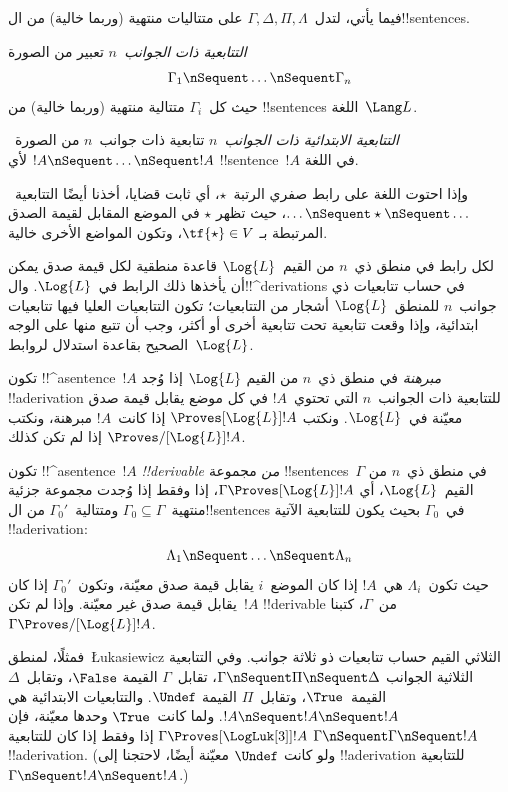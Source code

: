 \documentclass[../../../include/open-logic-section]{subfiles}
\begin{document}


فيما يأتي، لتدل~$\Gamma, \Delta, \Pi, \Lambda$ على متتاليات منتهية
(وربما خالية) من ال!!{sentence}s.

\begin{defn}[التتابعية]
\emph{التتابعية ذات الجوانب~$n$} تعبير من الصورة
\[
\Gamma_1 \nSequent \dots \nSequent \Gamma_n
\]
حيث كل~$\Gamma_i$ متتالية منتهية (وربما خالية) من !!{sentence}s
اللغة~$\Lang L$.
\end{defn}

\begin{defn}
\emph{التتابعية الابتدائية ذات الجوانب~$n$} تتابعية ذات جوانب~$n$ من
الصورة~$!A \nSequent \dots \nSequent !A$ لأي !!{sentence}~$!A$ في
اللغة.

وإذا احتوت اللغة على رابط صفري الرتبة~$\star$، أي ثابت قضايا، أخذنا
أيضًا التتابعية~$\dots \nSequent \star \nSequent \dots$، حيث تظهر
$\star$ في الموضع المقابل لقيمة الصدق المرتبطة بـ
$\tf{\star} \in V$، وتكون المواضع الأخرى خالية.
\end{defn}

لكل رابط في منطق ذي~$n$ من القيم~$\Log{L}$ قاعدة منطقية لكل قيمة صدق
يمكن أن يأخذها ذلك الرابط في~$\Log{L}$. وال!!^{derivation}s في حساب
تتابعيات ذي جوانب~$n$ للمنطق~$\Log{L}$ أشجار من التتابعيات؛ تكون
التتابعيات العليا فيها تتابعيات ابتدائية، وإذا وقعت تتابعية تحت
تتابعية أخرى أو أكثر، وجب أن تتبع منها على الوجه الصحيح بقاعدة
استدلال لروابط~$\Log{L}$.

\begin{defn}[المبرهنات]
تكون !!^a{sentence}~$!A$ \emph{مبرهنة} في منطق ذي~$n$ من القيم
$\Log{L}$ إذا وُجد !!a{derivation} للتتابعية ذات الجوانب~$n$ التي
تحتوي~$!A$ في كل موضع يقابل قيمة صدق معيّنة في~$\Log{L}$. ونكتب
$\Proves[\Log{L}] !A$ إذا كانت~$!A$ مبرهنة، ونكتب
$\Proves/[\Log{L}] !A$ إذا لم تكن كذلك.
\end{defn}

\begin{defn}[!!^{derivability}]
تكون !!^a{sentence}~$!A$ \emph{!!{derivable} من} مجموعة
!!{sentence}s~$\Gamma$ في منطق ذي~$n$ من القيم~$\Log{L}$، أي
$\Gamma \Proves[\Log{L}] !A$، إذا وفقط إذا وُجدت مجموعة جزئية
منتهية~$\Gamma_0 \subseteq \Gamma$ ومتتالية~$\Gamma_0'$ من
ال!!{sentence}s في~$\Gamma_0$ بحيث يكون للتتابعية الآتية
!!a{derivation}:
\[ \Lambda_1 \nSequent \dots \nSequent \Lambda_n \]
حيث تكون~$\Lambda_i$ هي~$!A$ إذا كان الموضع~$i$ يقابل قيمة صدق
معيّنة، وتكون~$\Gamma_0'$ إذا كان يقابل قيمة صدق غير معيّنة. وإذا لم
تكن~$!A$ !!{derivable} من~$\Gamma$، كتبنا
$\Gamma \Proves/[\Log{L}] !A$.
\end{defn}

فمثلًا، لمنطق~\L ukasiewicz الثلاثي القيم حساب تتابعيات ذو ثلاثة
جوانب. وفي التتابعية الثلاثية الجوانب
$\Gamma \nSequent \Pi \nSequent \Delta$، تقابل~$\Gamma$ القيمة
$\False$، وتقابل~$\Delta$ القيمة~$\True$، وتقابل~$\Pi$ القيمة
$\Undef$. والتتابعيات الابتدائية هي
$!A \nSequent !A \nSequent !A$. ولما كانت~$\True$ وحدها معيّنة، فإن
$\Gamma \Proves[\LogLuk[3]] !A$ إذا وفقط إذا كان للتتابعية
$\Gamma \nSequent \Gamma \nSequent !A$ !!a{derivation}. (ولو كانت
$\Undef$ معيّنة أيضًا، لاحتجنا إلى !!a{derivation} للتتابعية
$\Gamma \nSequent !A \nSequent !A$.)
\end{document}
